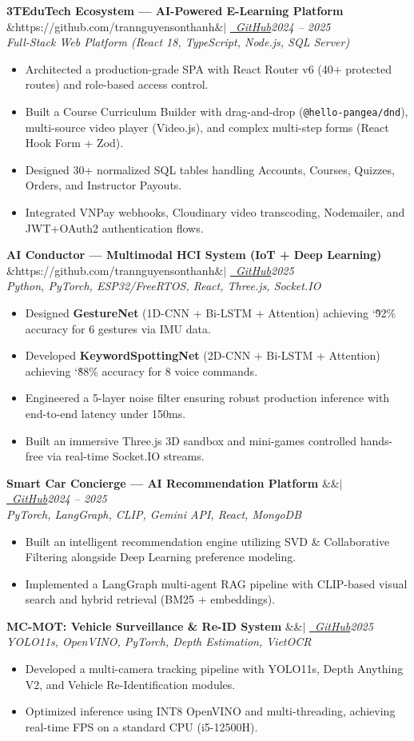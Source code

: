 \documentclass[10pt, a4paper]{article}
\newcommand{\resumeItem}[1]{\item \small #1}
\newcommand{\projectHeader}[3]{
  \vspace{3pt}
  \noindent\textbf{#1} \ifx&#2&\else $|$ \href{#2}{\color{linkcolor}\faGithub\ \textit{GitHub}}\fi \hfill \textit{\footnotesize #3}\\[2pt]
}
\begin{document}
\projectHeader{3TEduTech Ecosystem --- AI-Powered E-Learning Platform}{https://github.com/trannguyensonthanh}{2024 -- 2025}
\vspace{-2pt}
{\small \textit{Full-Stack Web Platform (React 18, TypeScript, Node.js, SQL Server)}}
\begin{itemize}
    \resumeItem{Architected a production-grade SPA with React Router v6 (40+ protected routes) and role-based access control.}
    \resumeItem{Built a Course Curriculum Builder with drag-and-drop (\texttt{@hello-pangea/dnd}), multi-source video player (Video.js), and complex multi-step forms (React Hook Form + Zod).}
    \resumeItem{Designed 30+ normalized SQL tables handling Accounts, Courses, Quizzes, Orders, and Instructor Payouts.}
    \resumeItem{Integrated VNPay webhooks, Cloudinary video transcoding, Nodemailer, and JWT+OAuth2 authentication flows.}
\end{itemize}

\projectHeader{AI Conductor --- Multimodal HCI System (IoT + Deep Learning)}{https://github.com/trannguyensonthanh}{2025}
\vspace{-2pt}
{\small \textit{Python, PyTorch, ESP32/FreeRTOS, React, Three.js, Socket.IO}}
\begin{itemize}
    \resumeItem{Designed \textbf{GestureNet} (1D-CNN + Bi-LSTM + Attention) achieving \char`\~92\% accuracy for 6 gestures via IMU data.}
    \resumeItem{Developed \textbf{KeywordSpottingNet} (2D-CNN + Bi-LSTM + Attention) achieving \char`\~88\% accuracy for 8 voice commands.}
    \resumeItem{Engineered a 5-layer noise filter ensuring robust production inference with end-to-end latency under 150ms.}
    \resumeItem{Built an immersive Three.js 3D sandbox and mini-games controlled hands-free via real-time Socket.IO streams.}
\end{itemize}

\projectHeader{Smart Car Concierge --- AI Recommendation Platform}{}{2024 -- 2025}
\vspace{-2pt}
{\small \textit{PyTorch, LangGraph, CLIP, Gemini API, React, MongoDB}}
\begin{itemize}
    \resumeItem{Built an intelligent recommendation engine utilizing SVD \& Collaborative Filtering alongside Deep Learning preference modeling.}
    \resumeItem{Implemented a LangGraph multi-agent RAG pipeline with CLIP-based visual search and hybrid retrieval (BM25 + embeddings).}
\end{itemize}

\projectHeader{MC-MOT: Vehicle Surveillance \& Re-ID System}{}{2025}
\vspace{-2pt}
{\small \textit{YOLO11s, OpenVINO, PyTorch, Depth Estimation, VietOCR}}
\begin{itemize}
    \resumeItem{Developed a multi-camera tracking pipeline with YOLO11s, Depth Anything V2, and Vehicle Re-Identification modules.}
    \resumeItem{Optimized inference using INT8 OpenVINO and multi-threading, achieving real-time FPS on a standard CPU (i5-12500H).}
\end{itemize}
\end{document}
